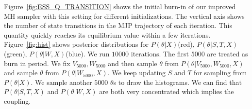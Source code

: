 Figure~\ref{fig:ESS_Q_TRANSITION} shows the initial burn-in of our improved MH sampler with this setting for different initializations. The vertical axis shows the number of state transitions in the MJP trajectory of each iteration. This quantity quickly reaches its equilibrium value within a few iterations.\\
Figure~\ref{fig:hist} shows posterior distributions for $P(\theta | X)$(red), $P(\theta | S, T, X)$(green), $P(\theta | W, X)$(blue). We run $10000$ iterations. The first $5000$ are treated as burn in period. We fix $V_{5000}, W_{5000}$ and then sample $\theta$ from $P(\theta | V_{5000}, W_{5000}, X)$ and sample $\theta$ from $P(\theta | W_{5000}, X)$. We keep updating $S$ and $T$ for sampling from $P(\theta | X)$. We sample another $5000$ $\theta$s to draw the histograms. We can find that $P(\theta | S, T, X)$ and $P(\theta | W, X)$ are both very concentrated which implies the coupling.
